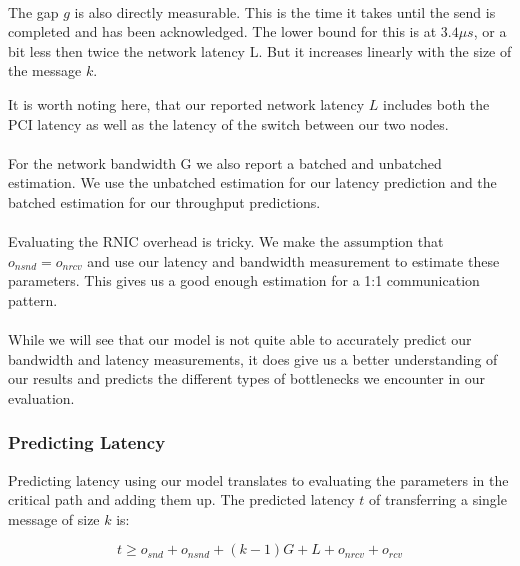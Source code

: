 \paragraph{} The gap $g$ is also directly measurable. This is the time it takes until the send is completed and has been
acknowledged. The lower bound for this is at $3.4\mu s$, or a bit less then twice the network latency L. But it increases
linearly with the size of the message $k$.

It is worth noting here, that our reported network latency $L$ includes both the PCI latency as well as the latency
of the switch between our two nodes.

\paragraph{} For the network bandwidth G we also report a batched and unbatched estimation. We use the unbatched estimation
for our latency prediction and the batched estimation for our throughput predictions.

\paragraph{} Evaluating the RNIC overhead is tricky. We make the assumption that $o_{nsnd} = o_{nrcv}$ and use our latency
and bandwidth measurement to estimate these parameters. This gives us a good enough estimation for a 1:1 communication pattern.




\paragraph{} While we will see that our model is not quite able to accurately predict our bandwidth and latency 
measurements, it does  give us a better understanding of our results and predicts the different types of bottlenecks 
we encounter in our evaluation.

\subsubsection{Predicting Latency}

Predicting latency using our model translates to evaluating the parameters in the critical path and adding them up. 
The predicted latency $t$ of transferring a single message of size $k$ is:

$$
t \geq o_{snd} + o_{nsnd}  + (k-1)G + L + o_{nrcv} + o_{rcv}
$$


